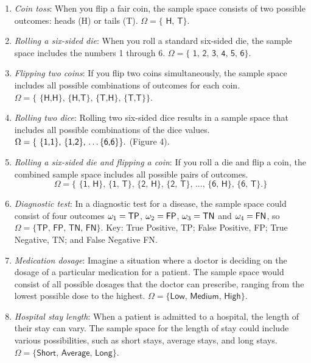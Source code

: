 \documentclass{tufte-handout}
\begin{document}
\begin{enumerate}

\item \textit{Coin toss}: When you flip a fair coin, the sample space consists of two possible outcomes: heads (H) or tails (T).
$\Omega = \{\textsf{ H, T}\}.$

\item \textit{ Rolling a six-sided die}: When you roll a standard six-sided die, the sample space includes the numbers 1 through 6.
$\Omega = \{\textsf{ 1, 2, 3, 4, 5, 6}\}.$

\item \textit{Flipping two coins}: If you flip two coins simultaneously, the sample space includes all possible combinations of outcomes for each coin.
$\Omega = \{\textsf{ \{H,H\}, \{H,T\}, \{T,H\}, \{T,T\}}\}.$

\item \textit{Rolling two dice}: Rolling two six-sided dice results in a sample space that includes all possible combinations of the dice values.
$\Omega = \{\textsf{ \{1,1\}, \{1,2\}, \dots \{6,6\}}\}.$ (Figure 4).

\item \textit{Rolling a six-sided die and flipping a coin}: If you roll a die and flip a coin, the combined sample space includes all possible pairs of outcomes.
$$\Omega = \{\textsf{ \{1, H\}, \{1, T\}, \{2, H\}, \{2, T\}, ..., \{6, H\}, \{6, T\} }.\}$$

\item \textit{Diagnostic test}: In a diagnostic test for a disease, the sample space could consist of four outcomes $\omega_1 = \sf TP$, $\omega_2 = \sf  FP$, $\omega_3 = \sf TN$ and $\omega_4 = \sf FN$, so $\Omega = \{\textsf{TP, FP, TN, FN}\}$. Key: True Positive, \textsf{TP}; False Positive, \textsf{FP}; True Negative, \textsf{TN}; and  False Negative \textsf{FN}.

\item \textit{Medication dosage}: Imagine a situation where a doctor is deciding on the dosage of a particular medication for a patient. The sample space would consist of all possible dosages that the doctor can prescribe, ranging from the lowest possible dose to the highest.
$\Omega = \{\textsf{Low, Medium, High}\}$.

\item \textit{Hospital stay length}: When a patient is admitted to a hospital, the length of their stay can vary. The sample space for the length of stay could include various possibilities, such as short stays, average stays, and long stays.  $\Omega = \{\textsf{Short, Average, Long}\}$.


\end{enumerate}
\end{document}
